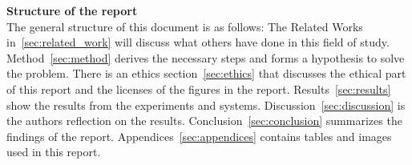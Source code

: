 

\textbf{Structure of the report}\\
The general structure of this document is as follows:
The Related Works in~\ref{sec:related_work} will discuss what others have done in this field of study.
Method~\ref{sec:method} derives the necessary steps and forms a hypothesis to solve the problem.
There is an ethics section~\ref{sec:ethics} that discusses the ethical part of this report and the licenses of the figures in the report.
Results~\ref{sec:results} show the results from the experiments and systems.
Discussion~\ref{sec:discussion} is the authors reflection on the results.
Conclusion~\ref{sec:conclusion} summarizes the findings of the report.
Appendices~\ref{sec:appendices} contains tables and images used in this report.











